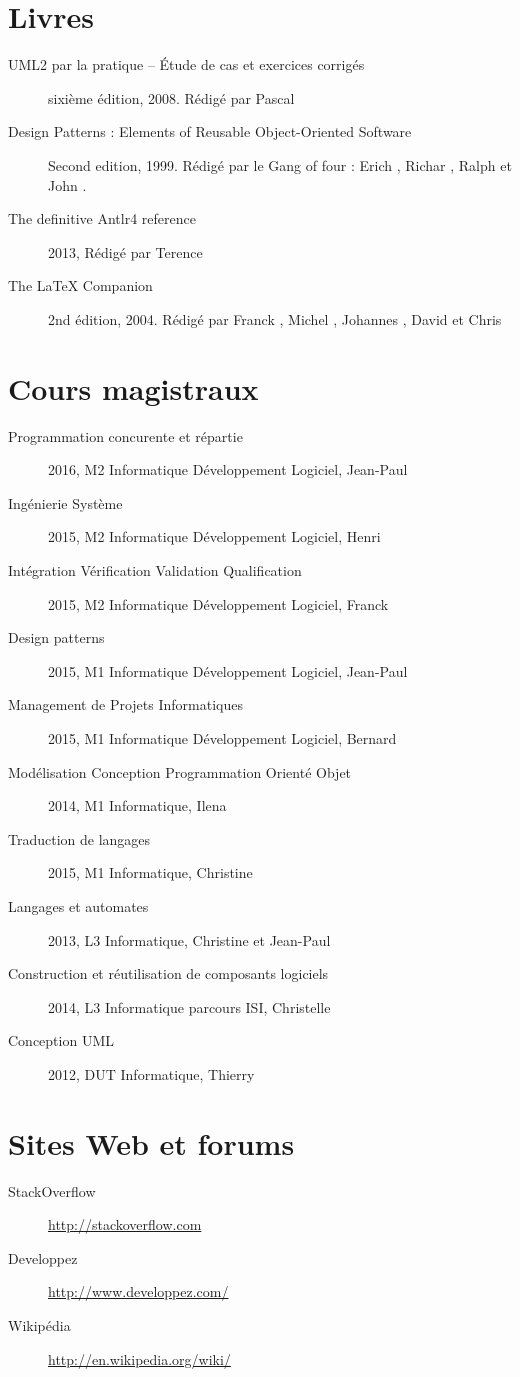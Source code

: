 \section{Livres}
	\begin{description}
	\item[UML2 par la pratique -- \'Etude de cas et exercices corrigés] sixième édition, 2008. Rédigé par Pascal 
	\item[Design Patterns : Elements of Reusable Object-Oriented Software] Second edition, 1999. Rédigé par le Gang of four : Erich , Richar , Ralph  et John .	
		\item[The definitive Antlr4 reference] 2013, Rédigé par Terence 
	\item[The \LaTeX{} Companion] 2nd édition, 2004. Rédigé par Franck , Michel , Johannes , David  et Chris  
\end{description}
\section{Cours magistraux}
\begin{description}
	\item[Programmation concurente et répartie] 2016, M2 Informatique Développement Logiciel, Jean-Paul 
	\item[Ingénierie Système] 2015, M2 Informatique Développement Logiciel, Henri 
	\item[Intégration Vérification Validation Qualification] 2015, M2 Informatique Développement Logiciel, Franck 
	\item[Design patterns] 2015, M1 Informatique Développement Logiciel, Jean-Paul 
	\item[Management de Projets Informatiques] 2015, M1 Informatique Développement Logiciel, Bernard 
	\item[Modélisation Conception Programmation Orienté Objet] 2014, M1 Informatique, Ilena 
	\item[Traduction de langages] 2015, M1 Informatique, Christine 
	\item[Langages et automates] 2013, L3 Informatique, Christine  et Jean-Paul 
	\item[Construction et réutilisation de composants logiciels] 2014, L3 Informatique parcours ISI, Christelle 
	\item[Conception UML] 2012, DUT Informatique, Thierry 
\end{description}
\section{Sites Web et forums}
	\begin{description}
		\item[StackOverflow] \url{http://stackoverflow.com}
		\item[Developpez] \url{http://www.developpez.com/}
		\item[Wikipédia] \url{http://en.wikipedia.org/wiki/}
	\end{description}

